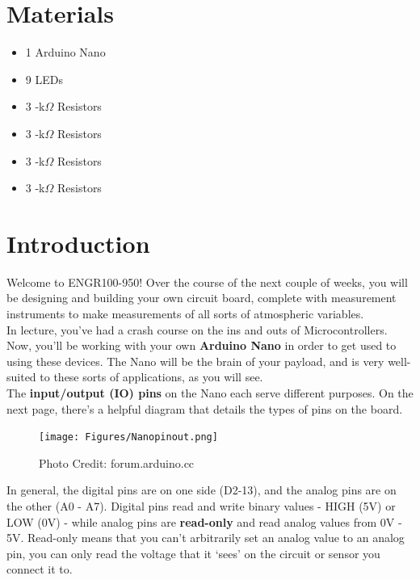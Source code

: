 \documentclass[12pt]{article}
\begin{document}
	\maketitle
	\thispagestyle{fancy}
	
	\section*{Materials}
	\begin{itemize}
		\item 1 \quad Arduino Nano
		\item 9 \quad LEDs
		\item 3 -k$\Omega$ Resistors
		\item 3 -k$\Omega$ Resistors
		\item 3 -k$\Omega$ Resistors
		\item 3 -k$\Omega$ Resistors
	\end{itemize}
	
\section*{Introduction}

Welcome to ENGR100-950! Over the course of the next couple of weeks,
you will be designing and building your own circuit board, complete
with measurement instruments to make measurements of all sorts of
atmospheric variables.\\
	
In lecture, you've had a crash course on the ins and outs of
Microcontrollers. Now, you'll be working with your own \textbf{Arduino
  Nano} in order to get used to using these devices. The Nano will be
the brain of your payload, and is very well-suited to these sorts of
applications, as you will see.\\
	
The \textbf{input/output (IO) pins} on the Nano each serve different
purposes. On the next page, there's a helpful diagram that details the
types of pins on the board.\\
	
\begin{figure}[h]
  \begin{center}
    \texttt{[image: Figures/Nanopinout.png]}
    \caption{Photo Credit: forum.arduino.cc}
  \end{center}
  \label{nano}
\end{figure}

In general, the digital pins are on one side (D2-13), and the analog
pins are on the other (A0 - A7). Digital pins read and write binary
values - HIGH (5V) or LOW (0V) - while analog pins are
\textbf{read-only} and read analog values from 0V - 5V. Read-only
means that you can't arbitrarily set an analog value to an analog pin,
you can only read the voltage that it `sees' on the circuit or sensor
you connect it to. \\
\end{document}
